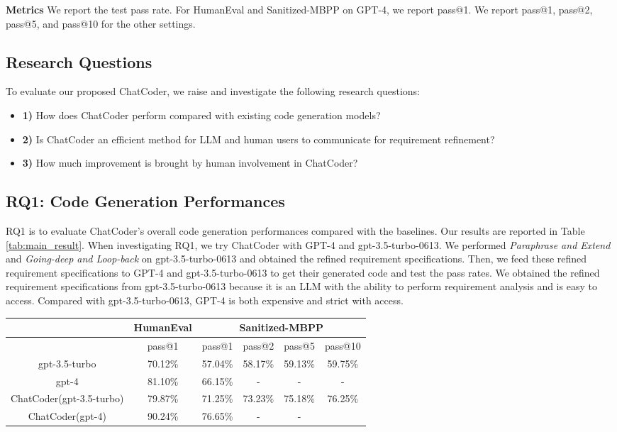 \documentclass[sigconf]{acmart}
\begin{document}
\textbf{Metrics} We report the test pass rate\cite{codex_humaneval}. For HumanEval and Sanitized-MBPP on GPT-4, we report pass@1. We report pass@1, pass@2, pass@5, and pass@10 for the other settings.

\subsection{Research Questions}
To evaluate our proposed ChatCoder, we raise and investigate the following research questions:
\begin{itemize}
    \item \textbf{1)} How does ChatCoder perform compared with existing code generation models?
    \item \textbf{2)} Is ChatCoder an efficient method for LLM and human users to communicate for requirement refinement?
    \item \textbf{3)} How much improvement is brought by human involvement in ChatCoder?
\end{itemize}
\subsection{RQ1: Code Generation Performances}
RQ1 is to evaluate ChatCoder's overall code generation performances compared with the baselines. Our results are reported in Table \ref{tab:main_result}. When investigating RQ1, we try ChatCoder with GPT-4 and gpt-3.5-turbo-0613. We performed \textit{Paraphrase and Extend} and \textit{Going-deep and Loop-back} on gpt-3.5-turbo-0613 and obtained the refined requirement specifications. Then, we feed these refined requirement specifications to GPT-4 and gpt-3.5-turbo-0613 to get their generated code and test the pass rates. We obtained the refined requirement specifications from gpt-3.5-turbo-0613 because it is an LLM with the ability to perform requirement analysis and is easy to access. Compared with gpt-3.5-turbo-0613, GPT-4 is both expensive and strict with access.

\begin{table*}[htbp]
    \centering
    \caption{Code Generation Performances}
    \begin{tabular}{c c | c  c  c c}
    \toprule
     & HumanEval & \multicolumn{4}{c}{Sanitized-MBPP} \\
     \midrule
     & pass@1 & pass@1 & pass@2 & pass@5 & pass@10\\
     \midrule
     gpt-3.5-turbo & 70.12\% & 57.04\% & 58.17\% & 59.13\% & 59.75\% \\
     gpt-4 & 81.10\% & 66.15\% & - & - & - \\
     \midrule
     ChatCoder(gpt-3.5-turbo) & 79.87\% & 71.25\% & 73.23\% & 75.18\% & 76.25\% \\
     ChatCoder(gpt-4) & 90.24\% & 76.65\% & - & - \\
     \bottomrule
    \end{tabular}
    
    \label{tab:main_result}
\end{table*}
\end{document}
